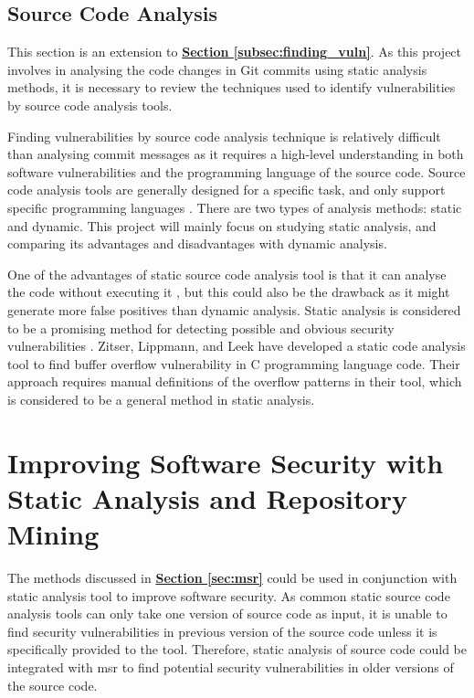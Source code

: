 \documentclass[12pt, a4paper]{report}
\begin{document}
\subsection{Source Code Analysis}
This section is an extension to \hyperref[subsec:finding_vuln]{\textbf{Section
\ref*{subsec:finding_vuln}}}. As this project involves in analysing the code changes in Git commits
using static analysis methods, it is necessary to review the techniques used to identify
vulnerabilities by source code analysis tools.

Finding vulnerabilities by source code analysis technique is relatively difficult than analysing
commit messages as it requires a high-level understanding in both software vulnerabilities and the
programming language of the source code. Source code analysis tools are generally designed for a
specific task, and only support specific programming languages \cite{antunes_2009}. There are two
types of analysis methods: static and dynamic. This project will mainly focus on studying static
analysis, and comparing its advantages and disadvantages with dynamic analysis.

One of the advantages of static source code analysis tool is that it can analyse the code without
executing it \cite{livshits_finding_2005}, but this could also be the drawback as it might generate
more false positives than dynamic analysis. Static analysis is considered to be a promising method
for detecting possible and obvious security vulnerabilities \cite{evans_2002}. Zitser, Lippmann, and
Leek \cite{zitser_2004} have developed a static code analysis tool to find buffer overflow
vulnerability in C programming language code. Their approach requires manual definitions of the
overflow patterns in their tool, which is considered to be a general method in static analysis.

\section{Improving Software Security with Static Analysis and Repository Mining}
The methods discussed in \hyperref[sec:msr]{\textbf{Section \ref*{sec:msr}}} could be used in
conjunction with static analysis tool to improve software security. As common static source code
analysis tools can only take one version of source code as input, it is unable to find security
vulnerabilities in previous version of the source code unless it is specifically provided to the
tool. Therefore, static analysis of source code could be integrated with \acrshort{msr} to find
potential security vulnerabilities in older versions of the source code.
\end{document}

